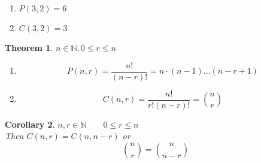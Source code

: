 \documentclass[letterpaper, 12pt]{article}
\newtheorem{theorem}{Theorem}[section]
\newtheorem{corollary}[theorem]{Corollary}
\newenvironment{example}[1][Example]{\begin{trivlist}
\item[\hskip \labelsep {\bfseries #1}]}{\end{trivlist}}
\newcommand{\N}{\mathbb{N}}
\newcommand{\0}{\emptyset}
\begin{document}
    \begin{example}
        \hfill
        \begin{enumerate}
            \item $P(3, 2) = 6$
            \item $C(3, 2) = 3$
        \end{enumerate}
    \end{example}
    \begin{theorem}
        $n \in \N, 0 \le r \le n$
        \begin{enumerate}
            \item \[P(n, r) = \frac{n!}{(n-r)!} = n \cdot (n-1)\dots(n-r+1)\]
            \item \[C(n, r) = \frac{n!}{r!(n-r)!} = \binom{n}{r}\]
        \end{enumerate}
    \end{theorem}
    \begin{corollary}
        $n, r \in \N \qquad 0 \le r \le n$ \\
        Then $C(n, r) = C(n, n-r)$ or \\
        \[\binom{n}{r} = \binom{n}{n-r}\]
    \end{corollary}
\end{document}
